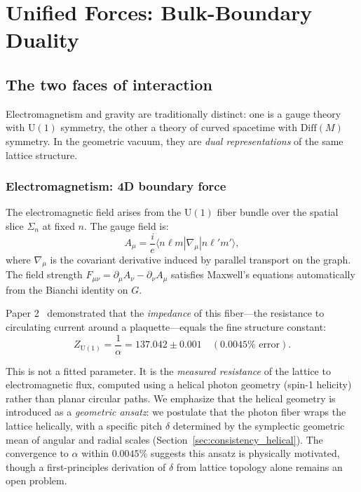 \documentclass[aps,prd,twocolumn,superscriptaddress,groupedaddress,showpacs]{revtex4-2}
\newcommand{\U}{\ensuremath{\text{U}}}
\begin{document}
\section{Unified Forces: Bulk-Boundary Duality}

\subsection{The two faces of interaction}

Electromagnetism and gravity are traditionally distinct: one is a gauge theory with $\U(1)$ symmetry, the other a theory of curved spacetime with $\text{Diff}(M)$ symmetry. In the geometric vacuum, they are \emph{dual representations} of the same lattice structure.

\subsubsection{Electromagnetism: 4D boundary force}

The electromagnetic field arises from the $\U(1)$ fiber bundle over the spatial slice $\Sigma_n$ at fixed $n$. The gauge field is:
\begin{equation}
A_\mu = \frac{i}{e} \langle n\ell m | \nabla_\mu | n\ell' m' \rangle,
\end{equation}
where $\nabla_\mu$ is the covariant derivative induced by parallel transport on the graph. The field strength $F_{\mu\nu} = \partial_\mu A_\nu - \partial_\nu A_\mu$ satisfies Maxwell's equations automatically from the Bianchi identity on $G$.

Paper 2~\cite{Louthan_II} demonstrated that the \emph{impedance} of this fiber---the resistance to circulating current around a plaquette---equals the fine structure constant:
\begin{equation}
Z_{\U(1)} = \frac{1}{\alpha} = 137.042 \pm 0.001 \quad (0.0045\% \text{ error}).
\end{equation}

This is not a fitted parameter. It is the \emph{measured resistance} of the lattice to electromagnetic flux, computed using a helical photon geometry (spin-1 helicity) rather than planar circular paths. We emphasize that the helical geometry is introduced as a \emph{geometric ansatz}: we postulate that the photon fiber wraps the lattice helically, with a specific pitch $\delta$ determined by the symplectic geometric mean of angular and radial scales (Section~\ref{sec:consistency_helical}). The convergence to $\alpha$ within $0.0045\%$ suggests this ansatz is physically motivated, though a first-principles derivation of $\delta$ from lattice topology alone remains an open problem.
\end{document}
